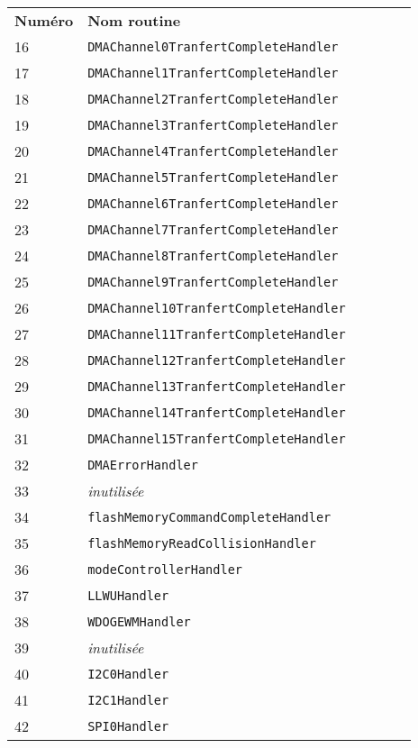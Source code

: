 \begin{table}[!t]
  \centering
  \begin{tabular}{llllll}
    \textbf{Numéro} & \textbf{Nom routine} \\
    16  & \texttt{DMAChannel0TranfertCompleteHandler}\\
    17  & \texttt{DMAChannel1TranfertCompleteHandler}\\
    18  & \texttt{DMAChannel2TranfertCompleteHandler}\\
    19  & \texttt{DMAChannel3TranfertCompleteHandler}\\
    20  & \texttt{DMAChannel4TranfertCompleteHandler}\\
    21  & \texttt{DMAChannel5TranfertCompleteHandler}\\
    22  & \texttt{DMAChannel6TranfertCompleteHandler}\\
    23  & \texttt{DMAChannel7TranfertCompleteHandler}\\
    24  & \texttt{DMAChannel8TranfertCompleteHandler}\\
    25  & \texttt{DMAChannel9TranfertCompleteHandler}\\
    26  & \texttt{DMAChannel10TranfertCompleteHandler}\\
    27  & \texttt{DMAChannel11TranfertCompleteHandler}\\
    28  & \texttt{DMAChannel12TranfertCompleteHandler}\\
    29  & \texttt{DMAChannel13TranfertCompleteHandler}\\
    30  & \texttt{DMAChannel14TranfertCompleteHandler}\\
    31  & \texttt{DMAChannel15TranfertCompleteHandler}\\
    32  & \texttt{DMAErrorHandler}\\
    33  & \emph{inutilisée} \\
    34  & \texttt{flashMemoryCommandCompleteHandler}\\
    35  & \texttt{flashMemoryReadCollisionHandler}\\
    36  & \texttt{modeControllerHandler}\\
    37  & \texttt{LLWUHandler}\\
    38  & \texttt{WDOGEWMHandler}\\
    39  & \emph{inutilisée} \\
    40  & \texttt{I2C0Handler}\\
    41  & \texttt{I2C1Handler}\\
    42  & \texttt{SPI0Handler}\\

\end{tabular}
\end{table}

